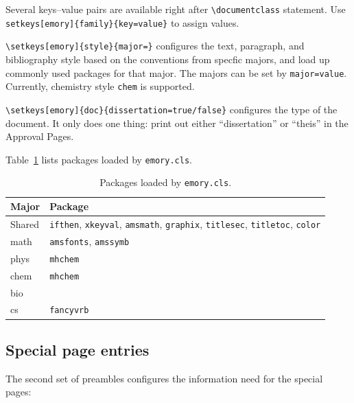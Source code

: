 \documentclass[draft, twoside]{emory}
\begin{document}
Several keys--value pairs are available right after \Verb|\documentclass| statement.
Use \Verb|setkeys[emory]{family}{key=value}| to assign values.

\Verb|\setkeys[emory]{style}{major=}| configures the text, paragraph, and 
bibliography style based on the conventions
from specfic majors, and load up commonly used packages for that major.
The majors can be set by \Verb|major=value|.
Currently, chemistry style \Verb|chem| is supported. 

\Verb|\setkeys[emory]{doc}{dissertation=true/false}| configures the type of the 
document. It only does one thing: print out either ``dissertation'' or ``theis''
in the Approval Pages.

Table~\ref{tbl:packages} lists packages loaded by \Verb|emory.cls|.
\begin{table}[htp!]
  \centering
  \caption{Packages loaded by \protect\Verb|emory.cls|. \label{tbl:packages}}
  \begin{tabular}{l l}
    \hline
    Major & Package \\
    \hline
    Shared & \protect\Verb|ifthen|, \protect\Verb|xkeyval|, \protect\Verb|amsmath|,
             \protect\Verb|graphix|, \protect\Verb|titlesec|, 
             \protect\Verb|titletoc|, \protect\Verb|color| \\
    math & \protect\Verb|amsfonts|, \protect\Verb|amssymb| \\
    phys & \protect\Verb|mhchem| \\
    chem & \protect\Verb|mhchem| \\
    bio & \\
    cs & \protect\Verb|fancyvrb| \\
    \hline
  \end{tabular}
\end{table}


\subsection{Special page entries}
The second set of preambles configures the information need for the special pages:
\end{document}
